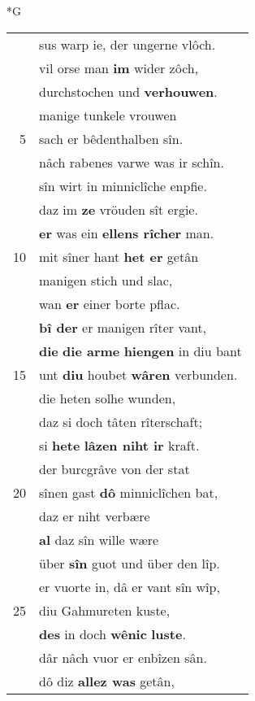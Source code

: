 \documentclass[8pt,a4paper,notitlepage]{article}
\begin{document}
\newpage
\begin{table}[ht]
\begin{minipage}[t]{0.5\linewidth}
\small
\begin{center}*G
\end{center}
\begin{tabular}{rl}
 & sus warp ie, der ungerne vlôch.\\ 
 & vil orse man \textbf{im} wider zôch,\\ 
 & durchstochen und \textbf{verhouwen}.\\ 
 & manige tunkele vrouwen\\ 
5 & sach er bêdenthalben sîn.\\ 
 & nâch rabenes varwe was ir schîn.\\ 
 & sîn wirt in minniclîche enpfie.\\ 
 & daz im \textbf{ze} vröuden sît ergie.\\ 
 & \textbf{er} was ein \textbf{ellens rîcher} man.\\ 
10 & mit sîner hant \textbf{het er} getân\\ 
 & manigen stich und slac,\\ 
 & wan \textbf{er} einer borte pflac.\\ 
 & \textbf{bî der} er manigen rîter vant,\\ 
 & \textbf{die} \textbf{die arme} \textbf{hiengen} in diu bant\\ 
15 & unt \textbf{diu} houbet \textbf{wâren} verbunden.\\ 
 & die heten solhe wunden,\\ 
 & daz si doch tâten rîterschaft;\\ 
 & si \textbf{hete} \textbf{lâzen niht ir} kraft.\\ 
 & der burcgrâve von der stat\\ 
20 & sînen gast \textbf{dô} minniclîchen bat,\\ 
 & daz er niht verbære\\ 
 & \textbf{al} daz sîn wille wære\\ 
 & über \textbf{sîn} guot und über den lîp.\\ 
 & er vuorte in, dâ er vant sîn wîp,\\ 
25 & diu Gahmureten kuste,\\ 
 & \textbf{des} in doch \textbf{wênic} \textbf{luste}.\\ 
 & dâr nâch vuor er enbîzen sân.\\ 
 & dô diz \textbf{allez was} getân,\\ 

\end{tabular}
\end{minipage}
\end{table}
\end{document}
